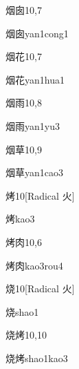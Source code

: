 \begin{entry}{烟囱}{10,7}
  \begin{phonetics}{烟囱}{yan1cong1}
  \end{phonetics}
\end{entry}

\begin{entry}{烟花}{10,7}
  \begin{phonetics}{烟花}{yan1hua1}
  \end{phonetics}
\end{entry}

\begin{entry}{烟雨}{10,8}
  \begin{phonetics}{烟雨}{yan1yu3}
  \end{phonetics}
\end{entry}

\begin{entry}{烟草}{10,9}
  \begin{phonetics}{烟草}{yan1cao3}
  \end{phonetics}
\end{entry}

\begin{entry}{烤}{10}[Radical 火]
  \begin{phonetics}{烤}{kao3}
  \end{phonetics}
\end{entry}

\begin{entry}{烤肉}{10,6}
  \begin{phonetics}{烤肉}{kao3rou4}
  \end{phonetics}
\end{entry}

\begin{entry}{烧}{10}[Radical 火]
  \begin{phonetics}{烧}{shao1}
  \end{phonetics}
\end{entry}

\begin{entry}{烧烤}{10,10}
  \begin{phonetics}{烧烤}{shao1kao3}
  \end{phonetics}
\end{entry}

